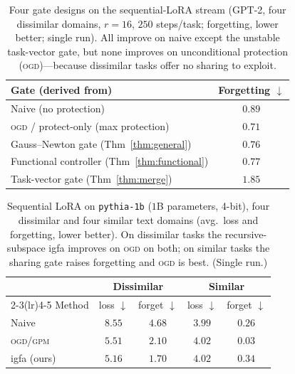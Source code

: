 \documentclass[10pt,a4paper]{article}
\theoremstyle{plain}
\theoremstyle{definition}
\newcommand{\IGFA}{igfa}
\newcommand{\OGD}{\textsc{ogd}}
\begin{document}
\begin{table}[htb]\centering\small
\caption{Four gate designs on the sequential-LoRA stream (GPT-2, four dissimilar domains,
$r=16$, $250$ steps/task; forgetting, lower better; single run). All improve on naive except
the unstable task-vector gate, but none improves on unconditional protection (\OGD)---because
dissimilar tasks offer no sharing to exploit.}
\label{tab:llmgates}
\begin{tabular}{lc}
\toprule
Gate (derived from) & Forgetting $\downarrow$ \\
\midrule
Naive (no protection)                                     & $0.89$ \\
\OGD{} / protect-only (max protection)                    & $\mathbf{0.71}$ \\
Gauss--Newton gate (Thm~\ref{thm:general})                & $0.76$ \\
Functional controller (Thm~\ref{thm:functional})          & $0.77$ \\
Task-vector gate (Thm~\ref{thm:merge})                    & $1.85$ \\
\bottomrule
\end{tabular}
\end{table}

\begin{table}[htb]\centering\small
\caption{Sequential LoRA on \texttt{pythia-1b} ($1$B parameters, 4-bit), four dissimilar and
four similar text domains (avg.\ loss and forgetting, lower better). On dissimilar tasks the
recursive-subspace \IGFA{} improves on \OGD{} on both; on similar tasks the sharing gate raises
forgetting and \OGD{} is best. (Single run.)}
\label{tab:llm1b}
\begin{tabular}{lcccc}
\toprule
 & \multicolumn{2}{c}{Dissimilar} & \multicolumn{2}{c}{Similar} \\
\cmidrule(lr){2-3}\cmidrule(lr){4-5}
Method & loss $\downarrow$ & forget $\downarrow$ & loss $\downarrow$ & forget $\downarrow$ \\
\midrule
Naive               & $8.55$ & $4.68$ & $3.99$ & $0.26$ \\
\OGD{}/\textsc{gpm} & $5.51$ & $2.10$ & $4.02$ & $\mathbf{0.03}$ \\
\IGFA{} (ours)      & $\mathbf{5.16}$ & $\mathbf{1.70}$ & $4.02$ & $0.34$ \\
\bottomrule
\end{tabular}
\end{table}
\end{document}
